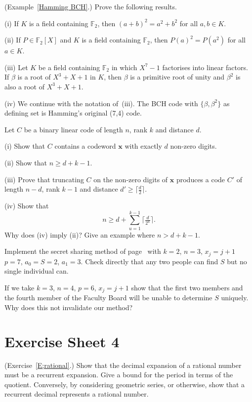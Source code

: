 \begin{question}\label{C3.13}
(Example~\ref{Hamming BCH}.)
Prove the following results.

(i) If $K$ is a field containing
${\mathbb F}_{2}$, then $(a+b)^{2}=a^{2}+b^{2}$
for all $a,b\in K$.

(ii) If $P\in {\mathbb F}_{2}[X]$ and $K$ is a field containing
${\mathbb F}_{2}$, then $P(a)^{2}=P(a^{2})$
for all $a\in K$.

(iii) Let $K$ be a field containing
${\mathbb F}_{2}$ in which $X^{7}-1$ factorises
into linear factors. If $\beta$ is a root of $X^{3}+X+1$
in $K$, then $\beta$ is a primitive root of unity
and $\beta^{2}$ is also a root of $X^{3}+X+1$.

(iv) We continue with the notation of~(iii).
The BCH
code with $\{\beta,\beta^{2}\}$ as defining set
is Hamming's original (7,4) code.
\end{question}
\begin{question}\label{C3.14} Let $C$ be a binary linear code of length
$n$, rank $k$ and distance $d$.

(i) Show that $C$ contains a codeword ${\mathbf x}$ with exactly
$d$ non-zero digits.

(ii) Show that $n\geq d+k-1$.

(iii) Prove that truncating $C$ on the non-zero
digits of ${\mathbf x}$ produces a code
$C'$ of length $n-d$, rank $k-1$ and distance
$d'\geq\lceil \tfrac{d}{2}\rceil$.

\noindent[Hint: To show $d'\geq\lceil \tfrac{d}{2}\rceil$,
consider, for ${\mathbf y}\in C$, the coordinates
where $x_{j}=y_{j}$ and the coordinates
where $x_{j}\neq y_{j}$.]

(iv) Show that
\[n\geq d+\sum_{u=1}^{k-1}\lceil \tfrac{d}{2^{u}}\rceil.\]
Why does (iv) imply (ii)? Give an example where
$n>d+k-1$.  
\end{question}
\begin{question}\label{C3.15} Implement the secret sharing method
of page~\pageref{P;secret sharing} with $k=2$, $n=3$, $x_{j}=j+1$
$p=7$, $a_{0}=S=2$, $a_{1}=3$. Check directly that any two
people
can find $S$ but no single individual can.

If we take $k=3$, $n=4$,
$p=6$,  $x_{j}=j+1$ show that 
the first two members and the
fourth member of the Faculty Board will
be unable to determine $S$ uniquely.
Why does this not invalidate our method?
\end{question}
\newpage
\section{Exercise Sheet 4}
\begin{question} (Exercise~\ref{E;rational}.)\label{C4.1} 
Show that the decimal expansion of
a rational number must be a recurrent expansion.
Give a bound for the period in terms of the quotient.
Conversely, by considering geometric series, or otherwise,
show that a recurrent decimal represents
a rational number.
\end{question}

